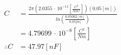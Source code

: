 \begin{align*}
    C &= \frac{2\pi \left( 2.0355 \,\cdot\,10^{-11}\left[\frac{C^2}{Nm^2}\right]\right) (0.05[m])}{ln(\frac{0.05002[m]}{0.05]m]})} \\
    &= 4.79699 \,\cdot\,10^{-8}\left[\frac{C^2}{Nm}\right] \\
    \therefore C &= 47.97 [nF]
\end{align*}
